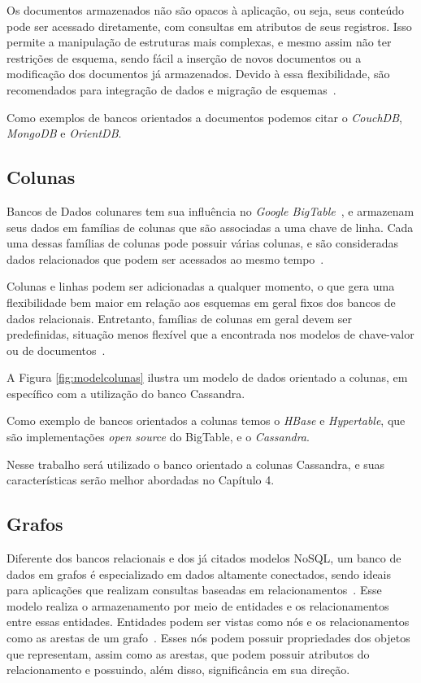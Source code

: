 
Os documentos armazenados não são opacos à aplicação, ou seja, seus conteúdo pode ser acessado diretamente, com consultas em atributos de seus registros. Isso permite a manipulação de estruturas mais complexas, e mesmo assim não ter restrições de esquema, sendo fácil a inserção de novos documentos ou a modificação dos documentos já armazenados. Devido à essa flexibilidade, são recomendados para integração de dados e migração de esquemas~\cite{nosqleval}. 

Como exemplos de bancos orientados a documentos podemos citar o \emph{CouchDB}, \emph{MongoDB} e \emph{OrientDB}.

\subsection*{Colunas}
Bancos de Dados colunares tem sua influência no \emph{Google BigTable}~\cite{bigtable}, e armazenam seus dados em famílias de colunas que são associadas a uma chave de linha. Cada uma dessas famílias de colunas pode possuir várias colunas, e são consideradas dados relacionados que podem ser acessados ao mesmo tempo~\cite{pramod}. 

Colunas e linhas podem ser adicionadas a qualquer momento, o que gera uma flexibilidade bem maior em relação aos esquemas em geral fixos dos bancos de dados relacionais.  Entretanto, famílias de colunas em geral devem ser predefinidas, situação menos flexível que a encontrada nos modelos de chave-valor ou de documentos~\cite{nosqleval}.  

A Figura \ref{fig:modelcolunas} ilustra um modelo de dados orientado a colunas, em específico com a utilização do banco Cassandra.

Como exemplo de bancos orientados a colunas temos o \emph{HBase} e \emph{Hypertable}, que são implementações \emph{open source} do BigTable, e o \emph{Cassandra}.

Nesse trabalho será utilizado o banco orientado a colunas Cassandra, e suas características serão melhor abordadas no Capítulo 4.


\subsection*{Grafos}
Diferente dos bancos relacionais e dos já citados modelos NoSQL, um banco de dados em grafos é especializado em dados altamente conectados, sendo ideais para aplicações que realizam consultas baseadas em relacionamentos~\cite{nosqleval}.
Esse modelo realiza o armazenamento por meio de entidades e os relacionamentos entre essas entidades. Entidades podem ser vistas como nós e os relacionamentos como as arestas de um grafo~\cite{pramod}. Esses nós podem possuir propriedades dos objetos que representam, assim como as arestas, que podem possuir atributos do relacionamento e possuindo, além disso, significância em sua direção.

